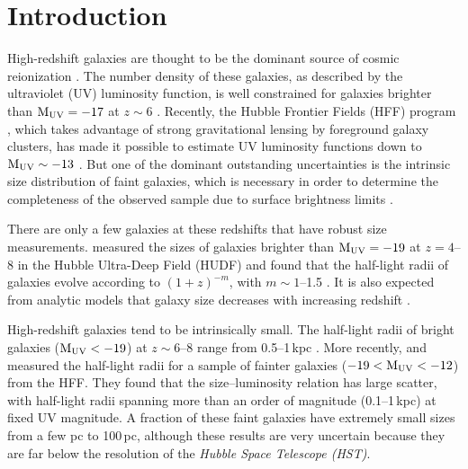 \documentclass[useAMS,usenatbib]{mn2e}
\begin{document}
\section{Introduction}
\label{sec:intro}
High-redshift galaxies are thought to be the dominant source of cosmic reionization \citep[e.g.][]{kuhlen.faucher.2012:reion,robertson.2013:reion.hudf12,robertson.2015:reion.planck}. The number density of these galaxies, as described by the ultraviolet (UV) luminosity function, is well constrained for galaxies brighter than $\rm M_{UV}=-17$ at $z\sim6$ \citep[e.g.][]{mclure.2013:uvlf.z7to9.hudf12,schenker.2013:uvlf.z7to8.udf12,bouwens.2015:uvlf.z4to10,finkelstein.2015:uvlf.combined.field}. Recently, the Hubble Frontier Fields (HFF) program \citep{lotz.2017:hubble.frontier.field}, which takes advantage of strong gravitational lensing by foreground galaxy clusters, has made it possible to estimate UV luminosity functions down to $\rm M_{UV}\sim-13$ \citep[e.g.][]{bouwens.2017:lensing.uncertainty,livermore.2017:faint.galaxies}. But one of the dominant outstanding uncertainties is the intrinsic size distribution of faint galaxies, which is necessary in order to determine the completeness of the observed sample due to surface brightness limits \citep{bouwens.2017:small.galaxy.sizes}.

There are only a few galaxies at these redshifts that have robust size measurements. \citet{oesch.2010:hudf.morphology} measured the sizes of galaxies brighter than $\rm M_{UV}=-19$ at $z=4$--8 in the Hubble Ultra-Deep Field (HUDF) and found that the half-light radii of galaxies  evolve according to $(1+z)^{-m}$, with $m\sim1$--1.5 \citep[see also, e.g.][]{bouwens.2004:hudf.size.evolution,ferguson.2004:size.evolution,ono.2013:size.evolution.udf12,kawamata.2015:hff.size.z6to8}. It is also expected from analytic models that galaxy size decreases with increasing redshift \citep{mo.mao.white.1998:galactic.disk,mo.mao.white.1999:lbg.structure}.

High-redshift galaxies tend to be intrinsically small. The half-light radii of bright galaxies ($\rm M_{UV}<-19$) at $z\sim6$--8 range from 0.5--1\,kpc \citep[e.g.][]{oesch.2010:hudf.morphology}. More recently, \citet{kawamata.2015:hff.size.z6to8} and \citet{bouwens.2017:small.galaxy.sizes} measured the half-light radii for a sample of fainter galaxies ($-19<\rm M_{UV}<-12$) from the HFF. They found that the size--luminosity relation has large scatter, with half-light radii spanning more than an order of magnitude (0.1--1\,kpc) at fixed UV magnitude. A fraction of these faint galaxies have extremely small sizes from a few pc to 100\,pc, although these results are very uncertain because they are far below the resolution of the {\it Hubble Space Telescope (HST)}.
\end{document}
